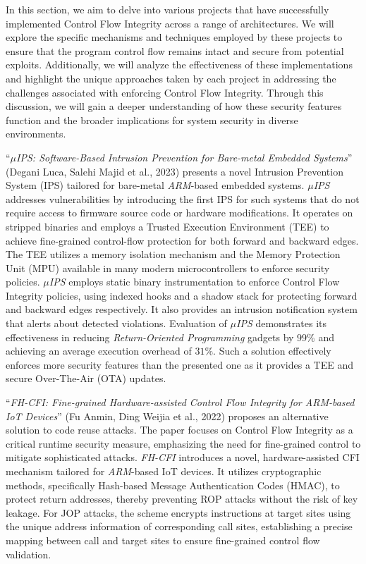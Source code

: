 In this section, we aim to delve into various projects that have successfully
implemented Control Flow Integrity across a range of architectures. We will explore
the specific mechanisms and techniques employed by these projects to ensure that
the program control flow remains intact and secure from potential exploits.
Additionally, we will analyze the effectiveness of these implementations and highlight
the unique approaches taken by each project in addressing the challenges associated
with enforcing Control Flow Integrity. Through this discussion, we will gain a deeper
understanding of how these security features function and the broader implications
for system security in diverse environments.

``\textit{$\mu$IPS: Software-Based Intrusion Prevention for Bare-metal Embedded
Systems}'' (Degani Luca, Salehi Majid et al., 2023)\cite{Degani} presents a
novel Intrusion Prevention System (IPS) tailored for bare-metal \textit{ARM}-based
embedded systems. \textit{$\mu$IPS} addresses vulnerabilities by introducing the
first IPS for such systems that do not require access to firmware source code or
hardware modifications. It operates on stripped binaries and employs a Trusted
Execution Environment (TEE) to achieve fine-grained control-flow protection for
both forward and backward edges. The TEE utilizes a memory isolation mechanism and
the Memory Protection Unit (MPU) available in many modern microcontrollers to enforce
security policies. \textit{$\mu$IPS} employs static binary instrumentation to enforce
Control Flow Integrity policies, using indexed hooks and a shadow stack for
protecting forward and backward edges respectively. It also provides an intrusion
notification system that alerts about detected violations. Evaluation of \textit{$\mu$IPS}
demonstrates its effectiveness in reducing \textit{Return-Oriented Programming}
gadgets by $99\%$ and achieving an average execution overhead of $31\%$. Such a solution
effectively enforces more security features than the presented one as it provides
a TEE and secure Over-The-Air (OTA) updates.

``\textit{FH-CFI: Fine-grained Hardware-assisted Control Flow Integrity for ARM-based
IoT Devices}'' (Fu Anmin, Ding Weijia et al., 2022)\cite{fhcfi} proposes an
alternative solution to code reuse attacks. The paper focuses on Control Flow Integrity
as a critical runtime security measure, emphasizing the need for fine-grained
control to mitigate sophisticated attacks. \textit{FH-CFI} introduces a novel, hardware-assisted
CFI mechanism tailored for \textit{ARM}-based IoT devices. It utilizes cryptographic
methods, specifically Hash-based Message Authentication Codes (HMAC), to protect
return addresses, thereby preventing ROP attacks without the risk of key leakage.
For JOP attacks, the scheme encrypts instructions at target sites using the
unique address information of corresponding call sites, establishing a precise mapping
between call and target sites to ensure fine-grained control flow validation.

